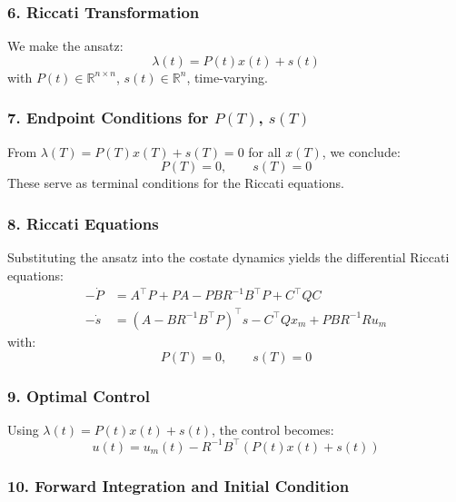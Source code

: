 \documentclass[11pt]{article}
\begin{document}
\subsubsection*{6. Riccati Transformation}

We make the ansatz:
\begin{equation}
\lambda(t) = P(t) x(t) + s(t)
\end{equation}
with \(P(t) \in \mathbb{R}^{n \times n}\), \(s(t) \in \mathbb{R}^n\), time-varying.

\subsubsection*{7. Endpoint Conditions for \(P(T)\), \(s(T)\)}

From \(\lambda(T) = P(T)x(T) + s(T) = 0\) for all \(x(T)\), we conclude:
\begin{equation}
P(T) = 0, \qquad s(T) = 0
\end{equation}
These serve as terminal conditions for the Riccati equations.

\subsubsection*{8. Riccati Equations}

Substituting the ansatz into the costate dynamics yields the differential Riccati equations:
\begin{align}
-\dot{P} &= A^\top P + P A - P B R^{-1} B^\top P + C^\top Q C \\
-\dot{s} &= (A - B R^{-1} B^\top P)^\top s - C^\top Q x_m + P B R^{-1} R u_m
\end{align}
with:
\begin{equation}
P(T) = 0, \qquad s(T) = 0
\end{equation}

\subsubsection*{9. Optimal Control}

Using \(\lambda(t) = P(t)x(t) + s(t)\), the control becomes:
\begin{equation}
u(t) = u_m(t) - R^{-1} B^\top (P(t) x(t) + s(t))
\end{equation}

\subsubsection*{10. Forward Integration and Initial Condition}
\end{document}
